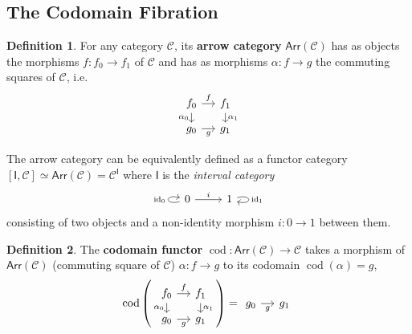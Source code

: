 \documentclass[12pt]{article}
\theoremstyle{definition}
\newtheorem{defn}{Definition}[section]
\theoremstyle{remark}
\DeclareMathOperator{\id}{id} %
\DeclareMathOperator{\cod}{cod}
\newcommand{\arr}{\mathsf{Arr}} %
\newcommand{\catC}{\mathcal{C}}
\begin{document}
\subsection{The Codomain Fibration}

\begin{defn}
    \label{def:arrow_category}
    For any category $\catC$, its \textbf{arrow category} $\arr(\catC)$ has as objects the morphisms $f : f_0 \to f_1$ of $\catC$ and has as morphisms $\alpha : f \to g$ the commuting squares of $\catC$, i.e.
    \begin{equation}
        \begin{tikzcd}[row sep=small, column sep=small]
            f_0 \ar[r, "f"] \ar[d, "\alpha_0"'] & f_1 \ar[d, "\alpha_1"] \\
            g_0 \ar[r, "g"'] & g_1
        \end{tikzcd}
    \end{equation}
\end{defn}
The arrow category can be equivalently defined as a functor category $[\mathsf{I}, \catC] \simeq \arr(\catC) = \catC^{\mathsf{I}}$ where $\mathsf{I}$ is the \textit{interval category}
\begin{equation}
    \begin{tikzcd}
        0 \ar[loop left, "\id_{0}"] \ar[r, "i"] & 1 \ar[loop right, "\id_{1}"]
    \end{tikzcd}
\end{equation}
consisting of two objects and a non-identity morphism $i : 0 \to 1$ between them.

\begin{defn}
    The \textbf{codomain functor} $\cod : \arr(\catC) \to \catC$ takes a morphism of $\arr(\catC)$ (commuting square of $\catC$) $\alpha : f \to g$ to its codomain $\cod (\alpha) = g$,
    \begin{equation}
        \cod \left(
            \begin{tikzcd}[row sep=small, column sep=small]
                f_0 \ar[r, "f"] \ar[d, "\alpha_0"'] & f_1 \ar[d, "\alpha_1"] \\
                g_0 \ar[r, "g"'] & g_1
            \end{tikzcd}
        \right)
        =
        \begin{tikzcd}[column sep=small]
            g_0 \ar[r, "g"'] & g_1
        \end{tikzcd}
    \end{equation}
\end{defn}
\end{document}
